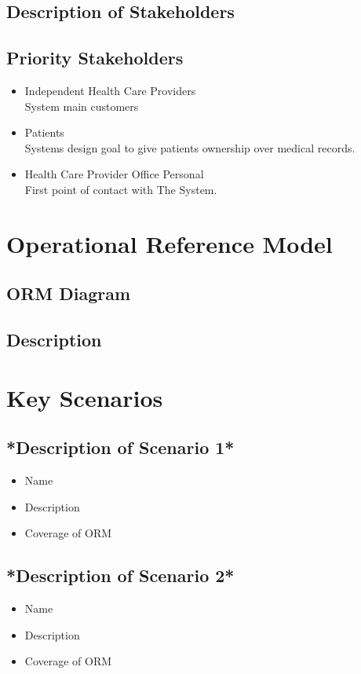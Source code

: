 \documentclass[12pt]{article}
\begin{document}
\subsection{Description of Stakeholders}

\subsection{Priority Stakeholders}
\begin{itemize}
\item Independent Health Care Providers
\\System main customers
\item Patients
\\Systems design goal to give patients ownership over medical records.
\item Health Care Provider Office Personal
\\First point of contact with The System.
\end{itemize}

\section{Operational Reference Model}

\subsection{ORM Diagram}

\subsection{Description}

\section{Key Scenarios}

\subsection{*Description of Scenario 1*}
\begin{itemize}
	\item Name
	\item Description
	\item Coverage of ORM
\end{itemize}
 
 \subsection{*Description of Scenario 2*}
 \begin{itemize}
 	\item Name
 	\item Description
 	\item Coverage of ORM
 \end{itemize}
 
\end{document}
